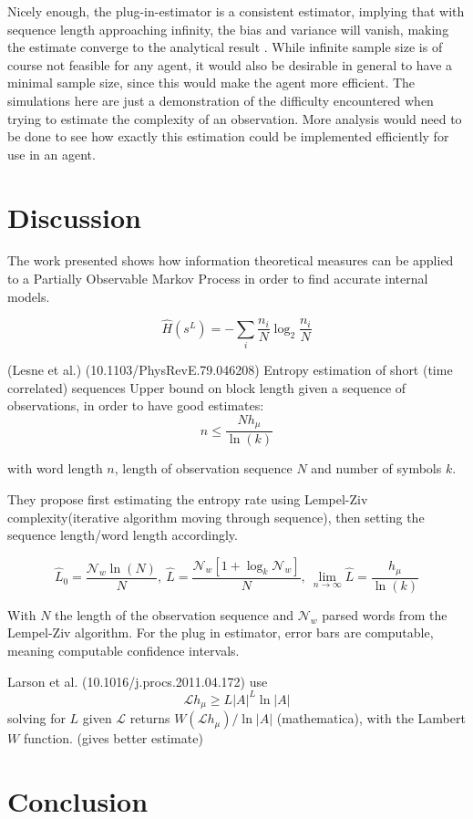 \documentclass[12pt,a4paper]{article}
\begin{document}
Nicely enough, the plug-in-estimator is a consistent estimator, implying that with sequence length approaching infinity, the bias and variance will vanish, making the estimate converge to the analytical result \autocite{basharin1959plugin}.
While infinite sample size is of course not feasible for any agent, it would also be desirable in general to have a minimal sample size, since this would make the agent more efficient.
The simulations here are just a demonstration of the difficulty encountered when trying to estimate the complexity of an observation.
More analysis would need to be done to see how exactly this estimation could be implemented efficiently for use in an agent.


\section{Discussion} \label{sec:discussion}
The work presented shows how information theoretical measures can be applied to a Partially Observable Markov Process in order to find accurate internal models.

$$\hat{H}(s^L) = -\sum_i \frac{n_i}{N} \log_2{\frac{n_i}{N}}$$

(Lesne et al.) (10.1103/PhysRevE.79.046208) Entropy estimation of short (time correlated) sequences
Upper bound on block length given a sequence of observations, in order to have good estimates:
$$ n \leq \frac{N h_\mu}{\ln(k)} $$

with word length $n$, length of observation sequence $N$ and number of symbols $k$.

They propose first estimating the entropy rate using Lempel-Ziv complexity(iterative algorithm moving through sequence), then setting the sequence length/word length accordingly.

$$ \hat{L}_0 = \frac{\mathcal{N}_w \ln(N)}{N},\ \hat{L}=\frac{\mathcal{N}_w[1+\log_k\mathcal{N}_w]}{N},\ \lim_{n \to \infty}\hat{L} = \frac{h_\mu}{\ln(k)} $$

With $N$ the length of the observation sequence and $\mathcal{N}_w$ parsed words from the Lempel-Ziv algorithm.
For the plug in estimator, error bars are computable, meaning computable confidence intervals.

Larson et al. (10.1016/j.procs.2011.04.172) use
$$ \mathcal{L} h_\mu \geq L|A|^L \ln|A| $$
solving for $L$ given $\mathcal{L}$ returns $W(\mathcal{L} h_\mu) / \ln|A|$ (mathematica), with the Lambert $W$ function.
(gives better estimate)


\section{Conclusion} \label{sec:conclusion}
\end{document}
